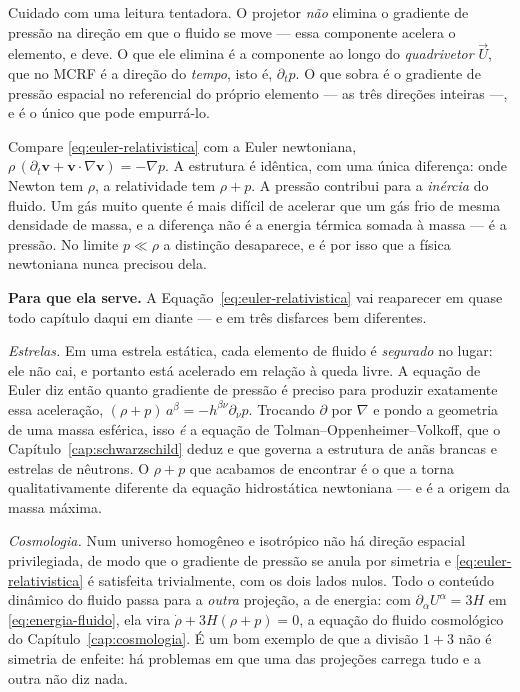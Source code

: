 \documentclass[12pt,a4paper,oneside]{book}
\theoremstyle{rgplain}
\theoremstyle{rgremark}
\begin{document}
Cuidado com uma leitura tentadora. O projetor \emph{não} elimina o gradiente
de pressão na direção em que o fluido se move --- essa componente acelera o
elemento, e deve. O que ele elimina é a componente ao longo do
\emph{quadrivetor} $\vec U$, que no MCRF é a direção do \emph{tempo}, isto é,
$\partial_t p$. O que sobra é o gradiente de pressão espacial no referencial do
próprio elemento --- as três direções inteiras ---, e é o único que pode
empurrá-lo.

\begin{central}
Compare \eqref{eq:euler-relativistica} com a Euler newtoniana,
$\rho\,(\partial_t\bm v+\bm v\cdot\nabla\bm v)=-\nabla p$. A estrutura é
idêntica, com uma única diferença: onde Newton tem $\rho$, a relatividade tem
$\rho+p$. A pressão contribui para a \emph{inércia} do fluido. Um gás muito
quente é mais difícil de acelerar que um gás frio de mesma densidade de
massa, e a diferença não é a energia térmica somada à massa --- é a pressão.
No limite $p\ll\rho$ a distinção desaparece, e é por isso que a física
newtoniana nunca precisou dela.
\end{central}

\textbf{Para que ela serve.} A Equação~\eqref{eq:euler-relativistica} vai
reaparecer em quase todo capítulo daqui em diante --- e em três disfarces bem
diferentes.

\emph{Estrelas.} Em uma estrela estática, cada elemento de fluido é
\emph{segurado} no lugar: ele não cai, e portanto está acelerado em relação à
queda livre. A equação de Euler diz então quanto gradiente de pressão é
preciso para produzir exatamente essa aceleração,
$(\rho+p)\,a^\beta=-h^{\beta\nu}\partial_\nu p$. Trocando $\partial$ por
$\nabla$ e pondo a geometria de uma massa esférica, isso \emph{é} a equação de
Tolman--Oppenheimer--Volkoff, que o Capítulo~\ref{cap:schwarzschild} deduz e
que governa a estrutura de anãs brancas e estrelas de nêutrons. O $\rho+p$ que
acabamos de encontrar é o que a torna qualitativamente diferente da equação
hidrostática newtoniana --- e é a origem da massa máxima.

\emph{Cosmologia.} Num universo homogêneo e isotrópico não há direção
espacial privilegiada, de modo que o gradiente de pressão se anula por
simetria e \eqref{eq:euler-relativistica} é satisfeita trivialmente, com os
dois lados nulos. Todo o conteúdo dinâmico do fluido passa para a
\emph{outra} projeção, a de energia: com $\partial_\alpha U^\alpha=3H$ em
\eqref{eq:energia-fluido}, ela vira $\dot\rho+3H(\rho+p)=0$, a equação do
fluido cosmológico do Capítulo~\ref{cap:cosmologia}. É um bom exemplo de que a
divisão $1+3$ não é simetria de enfeite: há problemas em que uma das
projeções carrega tudo e a outra não diz nada.
\end{document}
